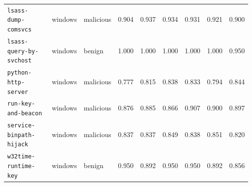 \begin{table}[t]
\begin{tabular}{@{}lllrrrrrr@{}}
\texttt{lsass-dump-comsvcs} & windows & malicious & 0.904 & 0.937 & 0.934 & 0.931 & 0.921 & 0.900\\
\texttt{lsass-query-by-svchost} & windows & benign & 1.000 & 1.000 & 1.000 & 1.000 & 1.000 & 0.950\\
\texttt{python-http-server} & windows & malicious & 0.777 & 0.815 & 0.838 & 0.833 & 0.794 & 0.844\\
\texttt{run-key-and-beacon} & windows & malicious & 0.876 & 0.885 & 0.866 & 0.907 & 0.900 & 0.897\\
\texttt{service-binpath-hijack} & windows & malicious & 0.837 & 0.837 & 0.849 & 0.838 & 0.851 & 0.820\\
\texttt{w32time-runtime-key} & windows & benign & 0.950 & 0.892 & 0.950 & 0.950 & 0.892 & 0.856\\
\bottomrule\end{tabular}\end{table}
